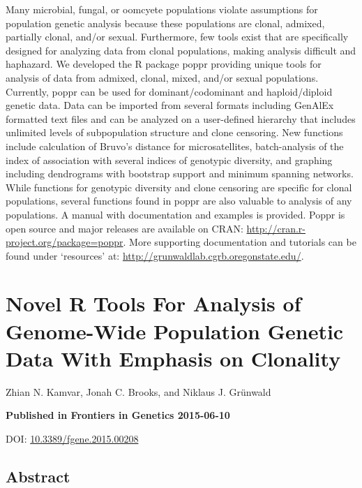 \documentclass[double,12pt]{beavtex}
\begin{document}
  Many microbial, fungal, or oomcyete populations violate assumptions for
  population genetic analysis because these populations are clonal,
  admixed, partially clonal, and/or sexual. Furthermore, few tools exist
  that are specifically designed for analyzing data from clonal
  populations, making analysis difficult and haphazard. We developed the R
  package poppr providing unique tools for analysis of data from admixed,
  clonal, mixed, and/or sexual populations. Currently, poppr can be used
  for dominant/codominant and haploid/diploid genetic data. Data can be
  imported from several formats including GenAlEx formatted text files and
  can be analyzed on a user-defined hierarchy that includes unlimited
  levels of subpopulation structure and clone censoring. New functions
  include calculation of Bruvo's distance for microsatellites,
  batch-analysis of the index of association with several indices of
  genotypic diversity, and graphing including dendrograms with bootstrap
  support and minimum spanning networks. While functions for genotypic
  diversity and clone censoring are specific for clonal populations,
  several functions found in poppr are also valuable to analysis of any
  populations. A manual with documentation and examples is provided. Poppr
  is open source and major releases are available on CRAN:
  \url{http://cran.r-project.org/package=poppr}. More supporting
  documentation and tutorials can be found under `resources' at:
  \url{http://grunwaldlab.cgrb.oregonstate.edu/}.
  
  \chapter{Novel R Tools For Analysis of Genome-Wide Population Genetic
  Data With Emphasis on
  Clonality}\label{novel-r-tools-for-analysis-of-genome-wide-population-genetic-data-with-emphasis-on-clonality}
  
  Zhian N. Kamvar, Jonah C. Brooks, and Niklaus J. Grünwald
  
  \vspace*{\fill}
  
  \textbf{Published in Frontiers in Genetics 2015-06-10}
  
  DOI:
  \href{http://dx.doi.org/10.3389/fgene.2015.00208}{10.3389/fgene.2015.00208}
  
  \newpage
  
  \section{Abstract}\label{abstract-1}
  
\end{document}
